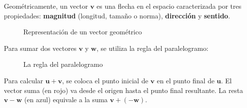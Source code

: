 \begin{definition}\label{defvectoresgeometrica}
 
Geométricamente, un vector $\mathbf{v}$ es una flecha en el espacio caracterizada por tres propiedades: \textbf{magnitud} (longitud, tamaño o norma), \textbf{dirección} y \textbf{sentido}.

\begin{figure}[H]
\centering
{}
\caption{Representación de un vector geométrico}
\end{figure}

Para sumar dos vectores $\mathbf{v}$ y $\mathbf{w}$, se utiliza la regla del paralelogramo:
 
\begin{figure}[H]
\centering
{}
\caption{La regla del paralelogramo}
\end{figure}

Para calcular $\mathbf{u}+\mathbf{v}$, se coloca el punto inicial de $\mathbf{v}$ en el punto final de $\mathbf{u}$. El vector suma (en rojo) va desde el origen hasta el punto final resultante. La resta $\mathbf{v}-\mathbf{w}$ (en azul) equivale a la suma $\mathbf{v}+(-\mathbf{w})$.
\end{definition}

